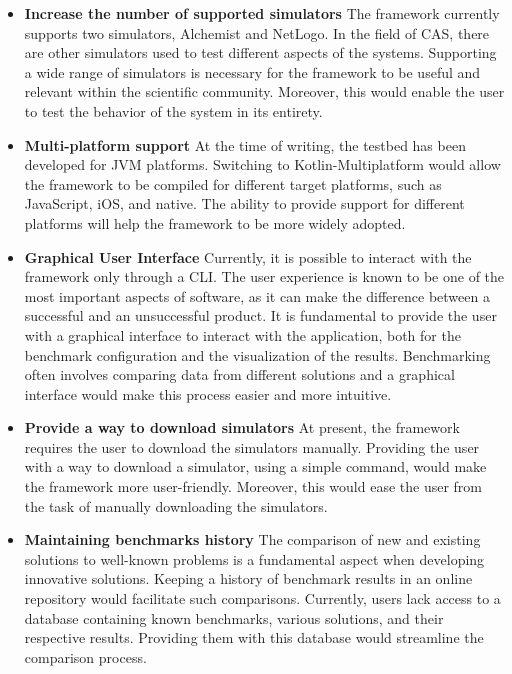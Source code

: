 \documentclass[12pt,a4paper,openright,twoside]{book}
\begin{document}
\begin{itemize}
  \item \textbf{Increase the number of supported simulators} 
  The framework currently supports two simulators, Alchemist and NetLogo.
  In the field of \ac*{CAS}, there are other simulators used to test different aspects of the systems.
  Supporting a wide range of simulators is necessary for the framework to be useful and relevant within the scientific community.
  Moreover, this would enable the user to test the behavior of the system in its entirety. 
  \item \textbf{Multi-platform support}
  At the time of writing, the testbed has been developed for JVM platforms. 
  Switching to Kotlin-Multiplatform would allow the framework to be compiled for different target platforms, such as JavaScript, iOS, and native.
  The ability to provide support for different platforms will help the framework to be more widely adopted.
  \item \textbf{Graphical User Interface}
  Currently, it is possible to interact with the framework only through a \ac*{CLI}.
  The user experience is known to be one of the most important aspects of software, as it can make the difference between a successful and an unsuccessful product.
  It is fundamental to provide the user with a graphical interface to interact with the application, both for the benchmark configuration and the visualization of the results.
  Benchmarking often involves comparing data from different solutions and a graphical interface would make this process easier and more intuitive.
  \item \textbf{Provide a way to download simulators}
  At present, the framework requires the user to download the simulators manually.
  Providing the user with a way to download a simulator, using a simple command, would make the framework more user-friendly.
  Moreover, this would ease the user from the task of manually downloading the simulators.
  \item \textbf{Maintaining benchmarks history}
  The comparison of new and existing solutions to well-known problems is a fundamental aspect when developing innovative solutions.
  Keeping a history of benchmark results in an online repository would facilitate such comparisons. 
  Currently, users lack access to a database containing known benchmarks, various solutions, and their respective results. 
  Providing them with this database would streamline the comparison process.
\end{itemize}


\backmatter




\end{document}
